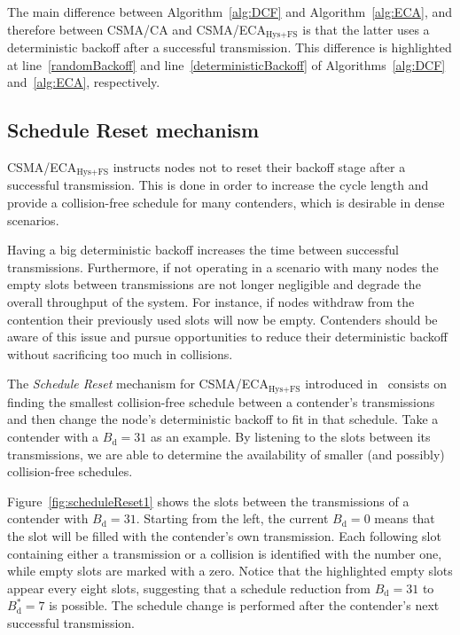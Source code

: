 The main difference between Algorithm~\ref{alg:DCF} and Algorithm~\ref{alg:ECA}, and therefore between CSMA/CA and CSMA/ECA$_{\text{Hys+FS}}$ is that the latter uses a deterministic backoff after a successful transmission. This difference is highlighted at line~\ref{randomBackoff} and line~\ref{deterministicBackoff} of Algorithms~\ref{alg:DCF} and~\ref{alg:ECA}, respectively.

\subsection{Schedule Reset mechanism}\label{scheduleReset}
CSMA/ECA$_{\text{Hys+FS}}$ instructs nodes not to reset their backoff stage after a successful transmission. This is done in order to increase the cycle length and provide a collision-free schedule for many contenders, which is desirable in dense scenarios.


Having a big deterministic backoff increases the time between successful transmissions. Furthermore, if not operating in a scenario with many nodes the empty slots between transmissions are not longer negligible and degrade the overall throughput of the system. For instance, if nodes withdraw from the contention their previously used slots will now be empty. Contenders should be aware of this issue and pursue opportunities to reduce their deterministic backoff without sacrificing too much in collisions. 

The \emph{Schedule Reset} mechanism for CSMA/ECA$_{\text{Hys+FS}}$ introduced in~\cite{sanabria2014high} consists on finding the smallest collision-free schedule between a contender's transmissions and then change the node's deterministic backoff to fit in that schedule. Take a contender with a $B_{\text{d}}=31$ as an example. By listening to the slots between its transmissions, we are able to determine the availability of smaller (and possibly) collision-free schedules. 

Figure~\ref{fig:scheduleReset1} shows the slots between the transmissions of a contender with $B_{\text{d}}=31$. Starting from the left, the current $B_{\text{d}}=0$ means that the slot will be filled with the contender's own transmission. Each following slot containing either a transmission or a collision is identified with the number one, while empty slots are marked with a zero. Notice that the highlighted empty slots appear every eight slots, suggesting that a schedule reduction from $B_{\text{d}}=31$ to $B_{\text{d}}^{*}=7$ is possible. The schedule change is performed after the contender's next successful transmission. 

